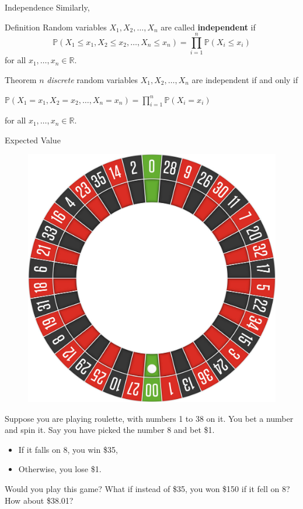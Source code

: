 \documentclass{beamer}
\newcommand{\R}{\mathbb{R}}
\newcommand{\PP}{\mathbb{P}}
\begin{document}
\begin{frame}{Independence}
    Similarly,

\begin{block}{Definition}
Random variables \( X_1, X_2, \dots, X_n \) are called \textbf{independent} if
\[ \PP(X_1 \le x_1, X_2 \le x_2, \dots, X_n \le x_n) =\prod_{i=1}^n \PP(X_i \le x_i)\]
for all $x_1,\dots,x_n\in\R$.
\end{block}

\pause

\begin{block}{Theorem}
  $n$ \textit{discrete} random variables \( X_1, X_2, \dots, X_n \) are independent if and only if
  \begin{center}
      $\PP(X_1 = x_1, X_2 = x_2, \dots, X_n = x_n) =\prod_{i=1}^n \PP(X_i =x_i)$
  \end{center}
for all $x_1,\dots,x_n\in\R$.
\end{block}


\end{frame}





\begin{frame}{Expected Value}
\begin{figure}
    \centering
    \includegraphics[width=0.3\linewidth]{roulette.png}
\end{figure}
Suppose you are playing roulette, with numbers 1 to 38 on it. You bet a number and spin it. \pause Say you have picked the number 8 and bet \$1. \pause
\begin{itemize}[<+->]
    \item If it falls on 8, you win \$35,
    \item Otherwise, you lose \$1.
\end{itemize}
\pause Would you play this game?
\pause \vspace{0.3em}
What if instead of \$35, you won \$150 if it fell on 8? \pause How about \$38.01?

\end{frame}
\end{document}
